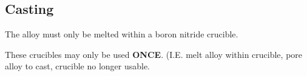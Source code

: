 \subsection{Casting}

The \MgZnCa alloy must only be melted within a boron nitride crucible. 

These crucibles may only be used \textbf{ONCE}. (I.E. melt alloy within crucible, pore alloy to cast, crucible no longer usable. 